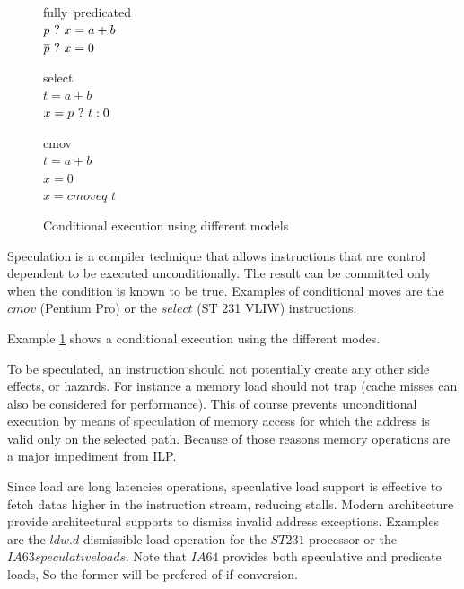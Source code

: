 \begin{figure}
\begin{minipage}[t]{3cm}
\mbox{fully predicated} \\
$p ~?~ x = a + b $ \\
$\overline{p} ~?~ x = 0 $ \\
\end{minipage} 
\begin{minipage}[t]{3cm}
\mbox{select} \\
$t = a + b $ \\
$x= p ~?~ t : 0 $ \\
\end{minipage}
\begin{minipage}[t]{3cm}
\mbox{cmov} \\
$t = a + b $ \\
$x = 0 $ \\
$x = cmoveq$ $t$ \\
\end{minipage}
\caption{Conditional execution using different models}
\label{fig:pred}
\end{figure}

Speculation is a compiler technique that allows instructions that are control dependent to be executed unconditionally. The result can be committed only when the condition is known to be true. Examples of conditional moves are the $cmov$ (Pentium Pro) or the $select$ (ST 231 VLIW) instructions.

Example \ref{fig:pred} shows a conditional execution using the different modes.

To be speculated, an instruction should not potentially create any other side effects, or hazards. For instance a memory load should not trap (cache misses can also be considered for performance). This of course prevents unconditional execution by means of speculation of memory access for which the address is valid only on the selected path. Because of those reasons memory operations are a major impediment from ILP. 

Since load are long latencies operations, speculative load support is effective to fetch datas higher in the instruction stream, reducing stalls. Modern architecture provide architectural supports to dismiss invalid address exceptions. Examples are the $ldw.d$ dismissible load operation for the $ST231$ processor or the $IA63 speculative loads$. Note that $IA64$ provides both speculative and predicate loads, So the former will be prefered of if-conversion. 

